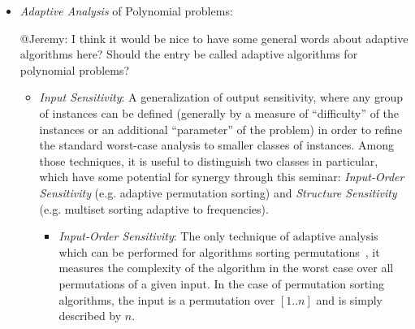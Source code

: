 \documentclass[a4paper,10pt]{article}
\begin{document}
\begin{itemize}

\item \emph{Adaptive Analysis} of Polynomial problems:
\begin{TODO}
\begin{STEFAN}
@Jeremy: I think it would be nice to have some general words about adaptive algorithms here? Should the entry be called adaptive algorithms for polynomial problems?
\end{STEFAN}
\end{TODO}
  \begin{itemize}

\item \emph{Input Sensitivity}: A generalization of output sensitivity, where any group of instances can be defined (generally by a measure of ``difficulty'' of the instances or an additional ``parameter'' of the problem) in order to refine the standard worst-case analysis to smaller classes of instances. Among those techniques, it is useful to distinguish two classes in particular, which have some potential for synergy through this seminar: \emph{Input-Order Sensitivity} (e.g. adaptive permutation sorting) and \emph{Structure Sensitivity} (e.g. multiset sorting adaptive to frequencies).
  \begin{LONG}
  \begin{itemize}
\item \emph{Input-Order Sensitivity}: The only technique of adaptive analysis which can be performed for algorithms sorting permutations~\cite{1992-ACMCS-ASurveyOfAdaptiveSortingAlgorithms-EstivillCastroWood,1995-DAM-AFrameworkForAdaptiveSorting-PeterssonMoffat,2013-TCS-CompressedRepresentationsOfPermutationsAndApplications-BarbayNavarro,2012-TCS-LRMTreesCompressedIndicesAdaptiveSortingAndCompressedPermutations-BarbayFischerNavarro,1994-IC-SortingShuffledMonotoneSequences-LevcopoulosPetersson,1985-TCom-MeasuresOfPresortednessAndOptimalSortingAlgorithms-Mannila,1979-CTCS-SortingPresortedFiles-Mehlhorn,1980-CACM-BestSortingAlgorithmForNearlySortedLists-CookKim,1958-InfAndC-SortingTreesAndMeasuresOfORder-Burge}, it measures the complexity of the algorithm in the worst case over all permutations of a given input. In the case of permutation sorting algorithms, the input is a permutation over $[1..n]$ and is simply described by $n$.


\end{itemize}
\end{LONG}
\end{itemize}
\end{itemize}
\end{document}
